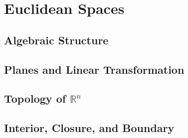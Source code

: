 \graphicspath{ {chapter8/images/}{chapter8/drafts/} }

\setcounter{chapter}{7}
\chapter{Euclidean Spaces}
\thispagestyle{empty}
\newpage

\section{Algebraic Structure}

\setcounter{Exercise}{1}


\vspace{12pt}

\setcounter{Exercise}{8}



\section{Planes and Linear Transformation}

\setcounter{Exercise}{3}


\vspace{12pt}

\setcounter{Exercise}{10}



\section{Topology of $\mathbb{R}^n$}

\setcounter{Exercise}{3}


\vspace{12pt}

\setcounter{Exercise}{5}


\vspace{12pt}



\vspace{12pt}



\vspace{12pt}




\section{Interior, Closure, and Boundary}

\setcounter{Exercise}{1}


\vspace{12pt}

\setcounter{Exercise}{3}


\vspace{12pt}

\setcounter{Exercise}{5}


\vspace{12pt}

\setcounter{Exercise}{8}

